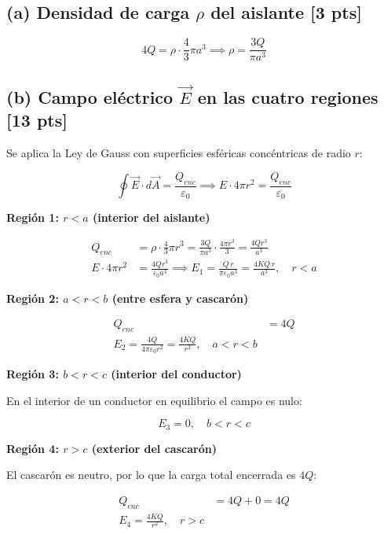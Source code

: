 \documentclass[12pt,letterpaper]{article}
\begin{document}
\subsection*{(a) Densidad de carga $\rho$ del aislante \hfill \normalfont\small[3 pts]}

\[
    4Q = \rho\cdot\frac{4}{3}\pi a^{3}
    \implies
    \boxed{\rho = \frac{3Q}{\pi a^{3}}}
\]

\subsection*{(b) Campo el\'ectrico $\vec{E}$ en las cuatro regiones \hfill \normalfont\small[13 pts]}

Se aplica la Ley de Gauss con superficies esf\'ericas concéntricas de radio $r$:

\[
    \oint \vec{E}\cdot d\vec{A} = \frac{Q_{enc}}{\varepsilon_0}
    \implies
    E\cdot 4\pi r^{2} = \frac{Q_{enc}}{\varepsilon_0}
\]

\medskip
\noindent\textbf{Regi\'on 1: $r < a$ (interior del aislante)}

\begin{align*}
    Q_{enc} &= \rho\cdot\frac{4}{3}\pi r^{3} = \frac{3Q}{\pi a^{3}}\cdot\frac{4\pi r^{3}}{3} = \frac{4Qr^{3}}{a^{3}}\\[4pt]
    E\cdot 4\pi r^{2} &= \frac{4Qr^{3}}{\varepsilon_0 a^{3}}
    \implies
    \boxed{E_{1} = \frac{Q\,r}{\pi\varepsilon_0 a^{3}} = \frac{4KQ\,r}{a^{3}}, \quad r < a}
\end{align*}

\noindent\textbf{Regi\'on 2: $a < r < b$ (entre esfera y cascarón)}

\begin{align*}
    Q_{enc} &= 4Q\\[4pt]
    \boxed{E_{2} = \frac{4Q}{4\pi\varepsilon_0 r^{2}} = \frac{4KQ}{r^{2}}, \quad a < r < b}
\end{align*}

\noindent\textbf{Regi\'on 3: $b < r < c$ (interior del conductor)}

En el interior de un conductor en equilibrio el campo es nulo:

\[
    \boxed{E_{3} = 0, \quad b < r < c}
\]

\noindent\textbf{Regi\'on 4: $r > c$ (exterior del cascarón)}

El cascarón es neutro, por lo que la carga total encerrada es $4Q$:

\begin{align*}
    Q_{enc} &= 4Q + 0 = 4Q\\[4pt]
    \boxed{E_{4} = \frac{4KQ}{r^{2}}, \quad r > c}
\end{align*}
\end{document}
